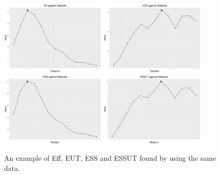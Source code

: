 \begin{figure}[h]
\centering
\includegraphics[width=0.45\textwidth]{Chapters/05MCMCOU/plots/ggeff.pdf}
\includegraphics[width=0.45\textwidth]{Chapters/05MCMCOU/plots/ggeut.pdf}
\includegraphics[width=0.45\textwidth]{Chapters/05MCMCOU/plots/ggess.pdf}
\includegraphics[width=0.45\textwidth]{Chapters/05MCMCOU/plots/ggessut.pdf}
\caption{An example of Eff, EUT, ESS and ESSUT found by using the same data. }
\label{effeutessessutexamplefigure}
\end{figure}



